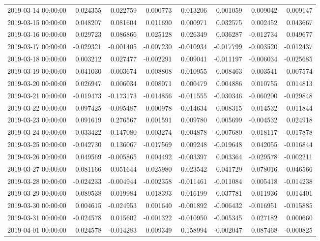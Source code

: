 \begin{tabular}{lrrrrrrr}
2019-03-14 00:00:00 & 0.024355 & 0.022759 & 0.000773 & 0.013206 & 0.001059 & 0.009042 & 0.009147 \\
2019-03-15 00:00:00 & 0.048207 & 0.081604 & 0.011690 & 0.000971 & 0.032575 & 0.002452 & 0.043667 \\
2019-03-16 00:00:00 & 0.029723 & 0.086866 & 0.025128 & 0.026349 & 0.036287 & -0.012734 & 0.049677 \\
2019-03-17 00:00:00 & -0.029321 & -0.001405 & -0.007230 & -0.010934 & -0.017799 & -0.003520 & -0.012437 \\
2019-03-18 00:00:00 & 0.003212 & 0.027477 & -0.002291 & 0.009041 & -0.011197 & -0.006034 & -0.025685 \\
2019-03-19 00:00:00 & 0.041030 & -0.003674 & 0.008808 & -0.010955 & 0.008463 & 0.003541 & 0.007574 \\
2019-03-20 00:00:00 & 0.026947 & 0.006034 & 0.008071 & 0.000479 & 0.004886 & 0.010755 & 0.014813 \\
2019-03-21 00:00:00 & -0.019473 & -0.173173 & -0.014856 & -0.011555 & -0.030346 & -0.060200 & -0.029848 \\
2019-03-22 00:00:00 & 0.097425 & -0.095487 & 0.000978 & -0.014634 & 0.008315 & 0.014532 & 0.011844 \\
2019-03-23 00:00:00 & 0.091619 & 0.276567 & 0.001591 & 0.009780 & 0.005699 & -0.004532 & 0.024918 \\
2019-03-24 00:00:00 & -0.033422 & -0.147080 & -0.003274 & -0.004878 & -0.007680 & -0.018117 & -0.017878 \\
2019-03-25 00:00:00 & -0.042730 & 0.136067 & -0.017569 & 0.009248 & -0.019648 & 0.042055 & -0.016844 \\
2019-03-26 00:00:00 & 0.049569 & -0.005865 & 0.004492 & -0.003397 & 0.003364 & -0.029578 & -0.002211 \\
2019-03-27 00:00:00 & 0.081166 & 0.051644 & 0.025980 & 0.023542 & 0.041729 & 0.078016 & 0.046566 \\
2019-03-28 00:00:00 & -0.024233 & -0.004944 & -0.002358 & -0.011461 & -0.011084 & 0.005418 & -0.014238 \\
2019-03-29 00:00:00 & 0.089538 & 0.019984 & 0.018393 & 0.016199 & 0.037781 & 0.011936 & 0.014401 \\
2019-03-30 00:00:00 & 0.004615 & -0.024953 & 0.001640 & -0.001892 & -0.006432 & -0.016951 & -0.015885 \\
2019-03-31 00:00:00 & -0.024578 & 0.015602 & -0.001322 & -0.010950 & -0.005345 & 0.027182 & 0.000660 \\
2019-04-01 00:00:00 & 0.024578 & -0.014283 & 0.009349 & 0.158994 & -0.002047 & 0.087468 & -0.000825 \\

\end{tabular}
